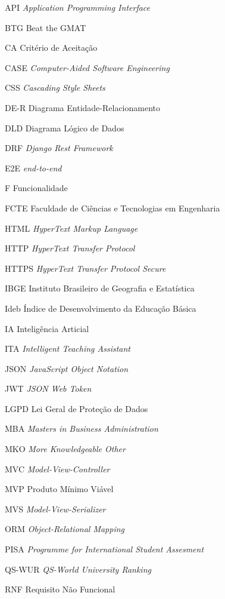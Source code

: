 \begin{siglas}
  \item[API] \textit{Application Programming Interface}
  \item[BTG] Beat the GMAT
  \item[CA] Critério de Aceitação
  \item[CASE] \textit{Computer-Aided Software Engineering}
  \item[CSS] \textit{Cascading Style Sheets}
  \item[DE-R] Diagrama Entidade-Relacionamento
  \item[DLD] Diagrama Lógico de Dados
  \item[DRF] \textit{Django Rest Framework}
  \item[E2E] \textit{end-to-end}
  \item[F] Funcionalidade
  \item[FCTE] Faculdade de Ciências e Tecnologias em Engenharia 
  \item[HTML] \textit{HyperText Markup Language}
  \item[HTTP] \textit{HyperText Transfer Protocol}
  \item[HTTPS] \textit{HyperText Transfer Protocol Secure}
  \item[IBGE] Instituto Brasileiro de Geografia e Estatística
  \item[Ideb] Índice de Desenvolvimento da Educação Básica
  \item[IA] Inteligência Articial
  \item[ITA] \textit{Intelligent Teaching Assistant} 
  \item[JSON] \textit{JavaScript Object Notation}
  \item[JWT] \textit{JSON Web Token}
  \item[LGPD] Lei Geral de Proteção de Dados
  \item[MBA] \textit{Masters in Business Administration}
  \item[MKO] \textit{More Knowledgeable Other}
  \item[MVC] \textit{Model-View-Controller}
  \item[MVP] Produto Mínimo Viável
  \item[MVS] \textit{Model-View-Serializer}
  \item[ORM] \textit{Object-Relational Mapping}
  \item[PISA] \textit{Programme for International Student Assesment}
  \item[QS-WUR] \textit{QS-World University Ranking}
  \item[RNF] Requisito Não Funcional

\end{siglas}
